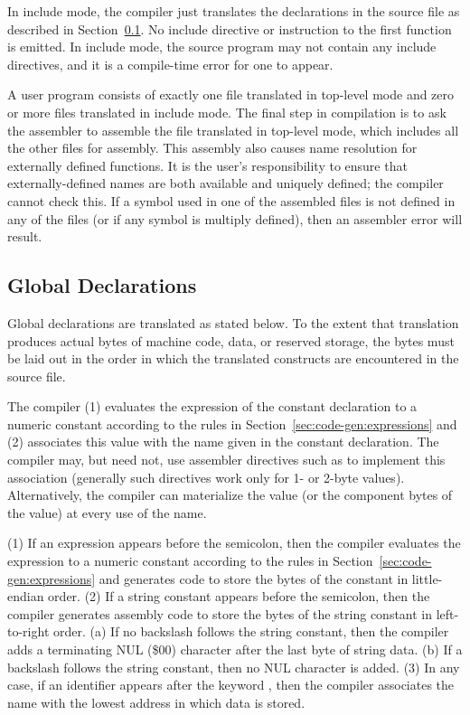 \documentclass[10pt]{article}
\begin{document}
 In include mode, the compiler just translates
the declarations in the source file as described in
Section~\ref{sec:code-gen:global-decls}.  No include directive or
 instruction to the first function is emitted.  In include
mode, the source program may not contain any include directives, and
it is a compile-time error for one to appear.

 A user program consists
of exactly one file translated in top-level mode and zero or more
files translated in include mode.  The final step in compilation is to
ask the assembler to assemble the file translated in top-level mode,
which includes all the other files for assembly.  This assembly also
causes name resolution for externally defined functions.  It is the
user's responsibility to ensure that externally-defined names are both
available and uniquely defined; the compiler cannot check this.  If a
symbol used in one of the assembled files is not defined in any of the
files (or if any symbol is multiply defined), then an assembler error
will result.

\subsection{Global Declarations}
\label{sec:code-gen:global-decls}

Global declarations are translated as stated below.  To the extent
that translation produces actual bytes of machine code, data, or
reserved storage, the bytes must be laid out in the order in which the
translated constructs are encountered in the source file.

 The compiler (1) evaluates the
expression of the constant declaration to a numeric constant according
to the rules in Section~\ref{sec:code-gen:expressions} and (2)
associates this value with the name given in the constant declaration.
The compiler may, but need not, use assembler directives such as
 to implement this association (generally such directives
work only for 1- or 2-byte values).  Alternatively, the compiler can
materialize the value (or the component bytes of the value) at every
use of the name.

 (1) If an expression appears before the
semicolon, then the compiler evaluates the expression to a numeric
constant according to the rules in
Section~\ref{sec:code-gen:expressions} and generates code to store the
bytes of the constant in little-endian order.  (2) If a string
constant appears before the semicolon, then the compiler generates
assembly code to store the bytes of the string constant in
left-to-right order.  (a) If no backslash \kwd{\bs} follows the string
constant, then the compiler adds a terminating NUL (\$00) character
after the last byte of string data. (b) If a backslash follows the
string constant, then no NUL character is added.  (3) In any case, if
an identifier appears after the keyword , then the compiler
associates the name with the lowest address in which data is stored.
\end{document}
